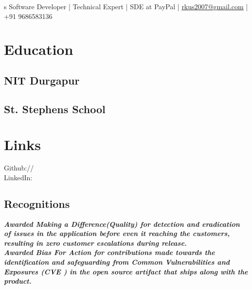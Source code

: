\documentclass[]{kushal-resume}
\begin{document}
s
 {  
Software Developer | Technical Expert | SDE at PayPal | 
\href{mailto:rkus2007@gmail.com}{rkus2007@gmail.com} | +91 9686583136} 
%
%

\begin{minipage}[t]{0.33\textwidth} 


\section{Education}

\subsection{NIT  Durgapur}
\sectionsep

\subsection{St. Stephens School}
\sectionsep


\section{Links}
Github:// \href{https://github.com/kushal-r}{} \\
LinkedIn: \href{https://www.linkedin.com/in/roykushal/}{} \\
\sectionsep


\vspace{\topsep}
\subsection{Recognitions}
\textbullet{} {\footnotesize \textit{\textbf{Awarded Making a Difference(Quality) for detection and eradication of issues in the application before even it reaching the customers, resulting in zero customer escalations during release. }}} \\
\textbullet{} {\footnotesize \textit{\textbf{Awarded Bias For Action for contributions made towards the identification and safeguarding from Common Vulnerabilities and Exposures (CVE ) in the open source artifact that ships along with the product. }}}  \\  
\sectionsep


\end{minipage}
\end{document}
